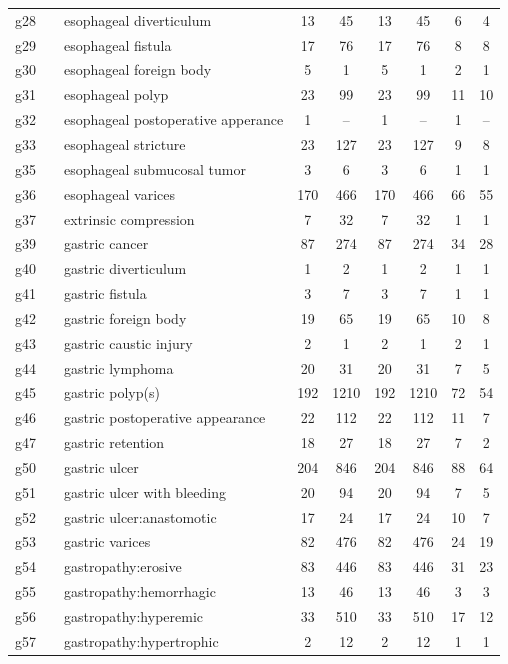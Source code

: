 \documentclass[preprint]{article}
\begin{document}
\begin{longtable}{c|l|l|c|c|c|c|c|c}
g28 &  & esophageal diverticulum & 13 & 45 & 13 & 45 & 6 & 4 \\ 
g29 &  & esophageal fistula & 17 & 76 & 17 & 76 & 8 & 8 \\ 
g30 &  & esophageal foreign body & 5 & 1 & 5 & 1 & 2 & 1 \\ 
g31 &  & esophageal polyp & 23 & 99 & 23 & 99 & 11 & 10 \\ 
g32 &  & esophageal postoperative apperance & 1 & -- & 1 & -- & 1 & -- \\ 
g33 &  & esophageal stricture & 23 & 127 & 23 & 127 & 9 & 8 \\ 
g35 &  & esophageal submucosal tumor & 3 & 6 & 3 & 6 & 1 & 1 \\ 
g36 &  & esophageal varices & 170 & 466 & 170 & 466 & 66 & 55 \\ 
g37 &  & extrinsic compression & 7 & 32 & 7 & 32 & 1 & 1 \\ 
g39 &  & gastric cancer & 87 & 274 & 87 & 274 & 34 & 28 \\ 
g40 &  & gastric diverticulum & 1 & 2 & 1 & 2 & 1 & 1 \\ 
g41 &  & gastric fistula & 3 & 7 & 3 & 7 & 1 & 1 \\ 
g42 &  & gastric foreign body & 19 & 65 & 19 & 65 & 10 & 8 \\ 
g43 &  & gastric caustic injury & 2 & 1 & 2 & 1 & 2 & 1 \\ 
g44 &  & gastric lymphoma & 20 & 31 & 20 & 31 & 7 & 5 \\ 
g45 &  & gastric polyp(s) & 192 & 1210 & 192 & 1210 & 72 & 54 \\ 
g46 &  & gastric postoperative appearance & 22 & 112 & 22 & 112 & 11 & 7 \\ 
g47 &  & gastric retention & 18 & 27 & 18 & 27 & 7 & 2 \\ 
g50 &  & gastric ulcer & 204 & 846 & 204 & 846 & 88 & 64 \\ 
g51 &  & gastric ulcer with bleeding & 20 & 94 & 20 & 94 & 7 & 5 \\ 
g52 &  & gastric ulcer:anastomotic & 17 & 24 & 17 & 24 & 10 & 7 \\ 
g53 &  & gastric varices & 82 & 476 & 82 & 476 & 24 & 19 \\ 
g54 &  & gastropathy:erosive & 83 & 446 & 83 & 446 & 31 & 23 \\ 
g55 &  & gastropathy:hemorrhagic & 13 & 46 & 13 & 46 & 3 & 3 \\ 
g56 &  & gastropathy:hyperemic & 33 & 510 & 33 & 510 & 17 & 12 \\ 
g57 &  & gastropathy:hypertrophic & 2 & 12 & 2 & 12 & 1 & 1 \\ 

\end{longtable}
\end{document}
